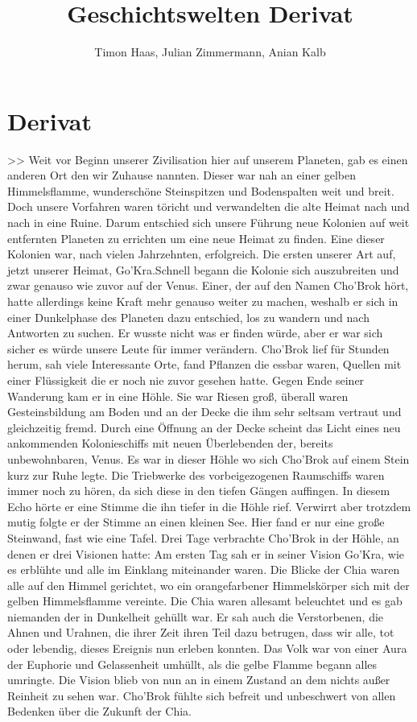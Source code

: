 \documentclass[12pt]{article}
\title{Geschichtswelten Derivat}
\author{Timon Haas, Julian Zimmermann, Anian Kalb}
\date{}
\begin{document}
\thispagestyle{empty}
\section*{Derivat}
	\linenumbers
>> Weit vor Beginn unserer Zivilisation hier auf unserem Planeten, gab es einen anderen Ort den wir Zuhause nannten. Dieser war nah an einer gelben Himmelsflamme, wunderschöne Steinspitzen und Bodenspalten weit und breit. Doch unsere Vorfahren waren töricht und verwandelten die alte Heimat nach und nach in eine Ruine. Darum entschied sich unsere Führung neue Kolonien auf weit entfernten Planeten zu errichten um eine neue Heimat zu finden. Eine dieser Kolonien war, nach vielen Jahrzehnten, erfolgreich. Die ersten unserer Art auf, jetzt unserer Heimat, Go'Kra.\newline Schnell begann die Kolonie sich auszubreiten und zwar genauso wie zuvor auf der Venus. Einer, der auf den Namen Cho'Brok hört, hatte allerdings keine Kraft mehr genauso weiter zu machen, weshalb er sich in einer Dunkelphase des Planeten dazu entschied, los zu wandern und nach Antworten zu suchen. Er wusste nicht was er finden würde, aber er war sich sicher es würde unsere Leute für immer verändern.\newline
Cho'Brok lief für Stunden herum, sah viele Interessante Orte, fand Pflanzen die essbar waren, Quellen mit einer Flüssigkeit die er noch nie zuvor gesehen hatte. Gegen Ende seiner Wanderung kam er in eine Höhle. Sie war Riesen groß, überall waren Gesteinsbildung am Boden und an der Decke die ihm sehr seltsam vertraut und gleichzeitig fremd. Durch eine Öffnung an der Decke scheint das Licht eines neu ankommenden Kolonieschiffs mit neuen Überlebenden der, bereits unbewohnbaren, Venus. Es war in dieser Höhle wo sich Cho'Brok auf einem Stein kurz zur Ruhe legte. Die Triebwerke des vorbeigezogenen Raumschiffs waren immer noch zu hören, da sich diese in den tiefen Gängen auffingen. In diesem Echo hörte er eine Stimme die ihn tiefer in die Höhle rief. Verwirrt aber trotzdem mutig folgte er der Stimme an einen kleinen See. Hier fand er nur eine große Steinwand, fast wie eine Tafel. \newline
Drei Tage verbrachte Cho'Brok in der Höhle, an denen er drei Visionen hatte:\newline
Am ersten Tag sah er in seiner Vision Go'Kra, wie es erblühte und alle im Einklang miteinander waren. Die Blicke der Chia waren alle auf den Himmel gerichtet, wo ein orangefarbener Himmelskörper sich mit der gelben Himmelsflamme vereinte. Die Chia waren allesamt beleuchtet und es gab niemanden der in Dunkelheit gehüllt war. Er sah auch die Verstorbenen, die Ahnen und Urahnen, die ihrer Zeit ihren Teil dazu betrugen, dass wir alle, tot oder lebendig, dieses Ereignis nun erleben konnten. Das Volk war von einer Aura der Euphorie und Gelassenheit umhüllt, als die gelbe Flamme begann alles umringte. Die Vision blieb von nun an in einem Zustand an dem nichts außer Reinheit zu sehen war. Cho'Brok fühlte sich befreit und unbeschwert von allen Bedenken über die Zukunft der Chia.\newline
\end{document}
